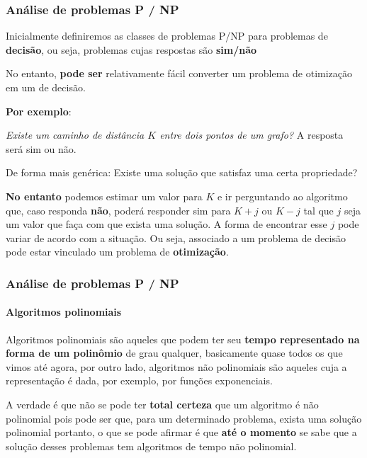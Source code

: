
\begin{frame}
	\frametitle{Análise de problemas P / NP}
	\par Inicialmente definiremos as classes de problemas P/NP para problemas de \textbf{decisão}, ou seja, problemas cujas respostas são \textbf{sim/não}
	
	\par No entanto, \textbf{pode ser} relativamente fácil converter um problema de otimização em um de decisão.
	
	\par \textbf{Por exemplo}:
	\par \textit{Existe um caminho de distância $K$ entre dois pontos de um grafo?} A resposta será sim ou não. \newline
	\par De forma mais genérica: Existe uma solução que satisfaz uma certa propriedade?\newline
	\par \textbf{No entanto} podemos estimar um valor para $K$ e ir perguntando ao algoritmo que, caso responda \textbf{não}, poderá responder sim para $K + j$ ou $K -j$ tal que $j$ seja um valor que faça com que exista uma solução. A forma de encontrar esse $j$ pode variar de acordo com a situação. Ou seja, associado a um problema de decisão pode estar vinculado um problema de \textbf{otimização}.
\end{frame}

\begin{frame}
	\frametitle{Análise de problemas P / NP}
	\framesubtitle{Algoritmos polinomiais}
	\par Algoritmos polinomiais são aqueles que podem ter seu \textbf{tempo representado na forma de um polinômio} de grau qualquer, basicamente quase todos os que vimos até agora,  por outro lado, algoritmos não polinomiais são aqueles cuja a representação é dada, por exemplo, por funções exponenciais.\newline
	\par A verdade é que não se pode ter \textbf{total certeza} que um algoritmo é não polinomial pois pode ser que, para um determinado problema, exista uma solução polinomial portanto, o que se pode afirmar é que \textbf{até o momento} se sabe que a solução desses problemas tem algoritmos de tempo não polinomial. 
\end{frame}

